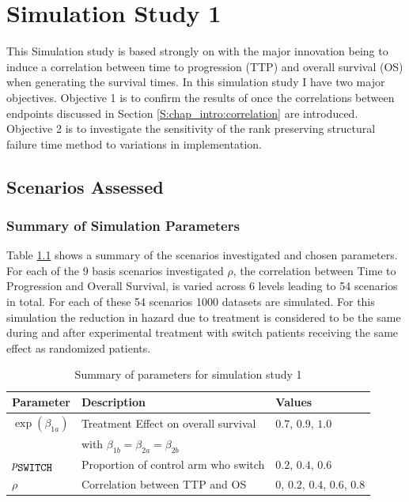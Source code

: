 \chapter{Simulation Study 1}
\label{C:chap_sim2}


This Simulation study is based strongly on \cite{Morden2011} with the major innovation being to induce a correlation between time to progression (TTP) and overall survival (OS) when generating the survival times.  In this simulation study I have two major objectives. Objective 1 is to confirm the results of \cite{Morden2011} once the correlations between endpoints discussed in Section \ref{S:chap_intro:correlation} are introduced. Objective 2 is to investigate the sensitivity of the rank preserving structural failure time method to variations in implementation. 

\section{Scenarios Assessed}



\subsection{Summary of Simulation Parameters}

Table \ref{T:chap_sim2:sim1parm} shows a summary of the scenarios investigated and chosen parameters. For each of the 9 basis scenarios investigated $\rho$, the correlation between Time to Progression and Overall Survival, is varied across 6 levels leading to 54 scenarios in total. For each of these 54 scenarios 1000 datasets are simulated. For this simulation the reduction in hazard due to treatment is considered to be the same during and after experimental treatment with switch patients receiving the same effect as randomized patients.

\begin{table}[ht] 
\caption{Summary of parameters for simulation study 1}
\centering 
\begin{tabular}{ l l l }
\hline
\hline
Parameter & Description & Values \\
\hline
$\exp(\beta_{1a})$        & Treatment Effect on overall survival & $0.7$, $0.9$, $1.0$ \\
                          & with $\beta_{1b}=\beta_{2a}=\beta_{2b}$    &                     \\
\hline                          
$p_{\verb+SWITCH+}$ & Proportion of control arm who switch &  $0.2$, $0.4$, $0.6$ \\
\hline
$\rho$                    & Correlation between TTP and OS  &  $0$, $0.2$, $0.4$, $0.6$, $0.8$ \\
\hline 
\end{tabular} 
\label{T:chap_sim2:sim1parm}
\end{table}


